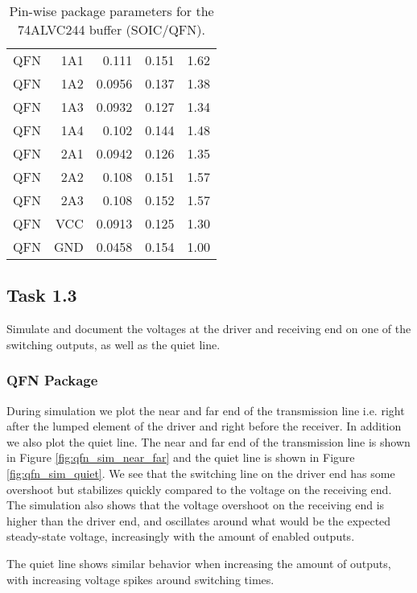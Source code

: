 \documentclass[../main.tex]{subfiles}
\begin{document}
\begin{table}[h]
\begin{tabular}{r|r r r r}
        QFN  & 1A1  & 0.111  & 0.151 & 1.62 \\
        QFN  & 1A2  & 0.0956 & 0.137 & 1.38 \\
        QFN  & 1A3  & 0.0932 & 0.127 & 1.34 \\
        QFN  & 1A4  & 0.102  & 0.144 & 1.48 \\
        QFN  & 2A1  & 0.0942 & 0.126 & 1.35 \\
        QFN  & 2A2  & 0.108  & 0.151 & 1.57 \\
        QFN  & 2A3  & 0.108  & 0.152 & 1.57 \\
        \midrule
        QFN  & VCC  & 0.0913 & 0.125 & 1.30 \\
        QFN  & GND  & 0.0458 & 0.154 & 1.00 \\
        \bottomrule[1pt]
    \end{tabular}
    \caption{Pin-wise package parameters for the 74ALVC244 buffer (SOIC/QFN).}
    \label{tab:pkg-params}
\end{table}

\newpage

\subsection{Task 1.3}

Simulate and document the voltages at the driver and receiving end on one of the switching outputs, as well as the quiet line.

\subsubsection{QFN Package}

During simulation we plot the near and far end of the transmission line i.e. right after the lumped element of the driver and right before the receiver. In addition we also plot the quiet line. The near and far end of the transmission line is shown in Figure \ref{fig:qfn_sim_near_far} and the quiet line is shown in Figure \ref{fig:qfn_sim_quiet}.
We see that the switching line on the driver end has some overshoot but stabilizes quickly compared to the voltage on the receiving end. 
The simulation also shows that the voltage overshoot on the receiving end is higher than the driver end, and oscillates around what would be the 
expected steady-state voltage, increasingly with the amount of enabled outputs. 

\vspace{10pt}
The quiet line shows similar behavior when increasing the amount of outputs, with increasing voltage spikes around switching times.
\end{document}
